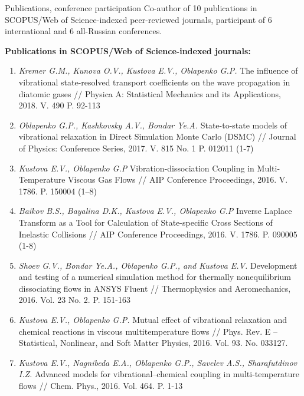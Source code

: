\documentclass{resume} %
\begin{document}
\begin{rSection}{Publications, conference participation}
Co-author of 10 publications in SCOPUS/Web of Science-indexed peer-reviewed journals, participant of 6 international and 6 all-Russian conferences.

{\bf Publications in SCOPUS/Web of Science-indexed journals:}

\begin{enumerate}
\item \emph{Kremer G.M., Kunova O.V., Kustova E.V., Oblapenko G.P.} The influence of vibrational state-resolved transport coefficients on the wave propagation in diatomic gases // Physica A: Statistical Mechanics and its Applications, 2018. V. 490 P. 92-113

\item \emph{Oblapenko G.P., Kashkovsky A.V., Bondar Ye.A.} State-to-state models of vibrational relaxation in Direct Simulation Monte Carlo (DSMC) // Journal of Physics: Conference Series, 2017. V. 815 No. 1 P. 012011 (1-7)

\item  \emph{Kustova E.V., Oblapenko G.P} Vibration-dissociation Coupling in Multi-Temperature Viscous Gas Flows // AIP Conference Proceedings, 2016. V. 1786. P. 150004 (1–8)

\item  \emph{Baikov B.S., Bayalina D.K., Kustova E.V., Oblapenko G.P} Inverse Laplace Transform as a Tool for Calculation of State-specific Cross Sections of Inelastic Collisions // AIP Conference Proceedings, 2016. V. 1786. P. 090005 (1-8)

\item  \emph{Shoev G.V., Bondar Ye.A., Oblapenko G.P., and Kustova E.V.} Development and testing of a numerical simulation method for thermally nonequilibrium dissociating flows in ANSYS Fluent // Thermophysics and Aeromechanics, 2016. Vol. 23 No. 2. P. 151-163

\item  \emph{Kustova E.V., Oblapenko G.P.} Mutual effect of vibrational relaxation and chemical reactions in viscous multitemperature flows // Phys. Rev. E -- Statistical, Nonlinear, and Soft Matter Physics, 2016. Vol. 93. No. 033127.

\item  \emph{Kustova E.V., Nagnibeda E.A., Oblapenko G.P., Savelev A.S., Sharafutdinov I.Z.} Advanced models for vibrational–chemical coupling in multi-temperature flows // Chem. Phys., 2016. Vol. 464. P. 1-13


\end{enumerate}
\end{rSection}
\end{document}
